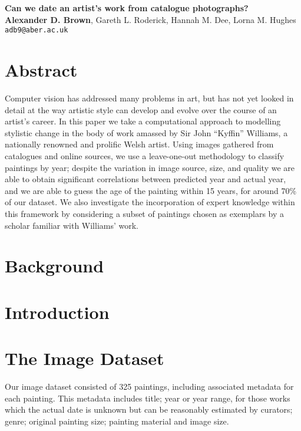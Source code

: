 \documentclass[a4,portrait]{template/a0poster}
\begin{document}
\begin{minipage}[b]{\linewidth}
\VeryHuge \color{NavyBlue} \textbf{Can we date an artist's work from catalogue photographs?}
\color{Black}\\ %
\huge \textbf{Alexander D. Brown}, Gareth L. Roderick, Hannah M. Dee, Lorna M.
Hughes\\[0.5cm] %
\Large \texttt{adb9@aber.ac.uk}\\
\end{minipage}
\vspace{1cm} %

\begin{multicols}{2}

\Large
\section*{Abstract}
Computer vision has addressed many problems in art, but has not yet looked in
detail at the way artistic style can develop and evolve over the course of an
artist's career. In this paper we take a computational approach to modelling
stylistic change in the body of work amassed by Sir John “Kyffin” Williams, a
nationally renowned and prolific Welsh artist. Using images gathered from
catalogues and online sources, we use a leave-one-out methodology to classify
paintings by year; despite the variation in image source, size, and quality we
are able to obtain significant correlations between predicted year and actual
year, and we are able to guess the age of the painting within 15 years, for
around 70\% of our dataset. We also investigate the incorporation of expert
knowledge within this framework by considering a subset of paintings chosen as
exemplars by a scholar familiar with Williams' work.

\section*{Background}

\section*{Introduction}

\section*{The Image Dataset}
Our image dataset consisted of 325 paintings, including associated metadata for
each painting. This metadata includes title; year or year range, for those
works which the actual date is unknown but can be reasonably estimated by
curators; genre; original painting size; painting material and image size.


\end{multicols}
\end{document}
